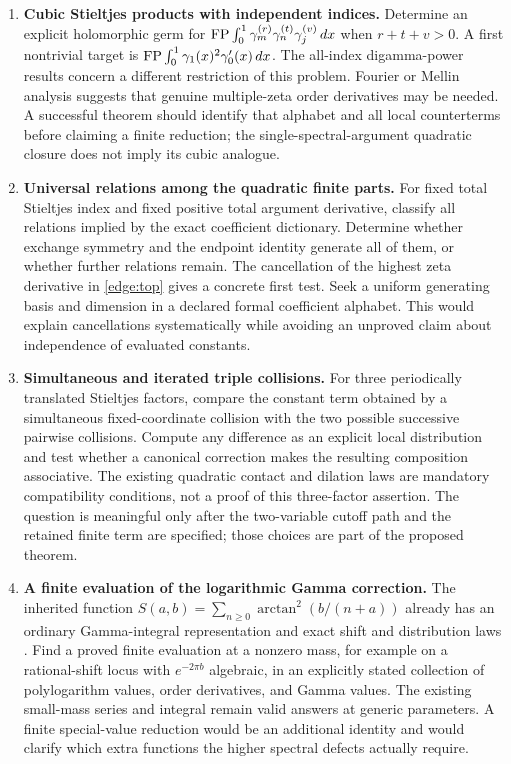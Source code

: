 \begin{enumerate}[leftmargin=*,label=\textbf{R\arabic*.}]
\item \textbf{Cubic Stieltjes products with independent indices.}
Determine an explicit holomorphic germ for
$\operatorname{FP}\int_0^1\gamma_m^{(r)}\gamma_n^{(t)}\gamma_j^{(v)}\,dx$
when $r+t+v>0$. A first nontrivial target is
$\operatorname{FP}\int_0^1\gamma_1(x)^2\gamma_0'(x)\,dx$.
The all-index digamma-power results concern a different restriction
of this problem. Fourier or Mellin analysis suggests that genuine
multiple-zeta order derivatives may be needed. A successful theorem
should identify that alphabet and all local counterterms before
claiming a finite reduction; the single-spectral-argument quadratic
closure does not imply its cubic analogue.

\item \textbf{Universal relations among the quadratic finite parts.}
For fixed total Stieltjes index and fixed positive total argument
derivative, classify all relations implied by the exact coefficient
dictionary. Determine whether exchange symmetry and the endpoint
identity generate all of them, or whether further relations remain.
The cancellation of the highest zeta derivative in
\eqref{edge:top} gives a concrete first test. Seek a uniform generating
basis and dimension in a declared formal coefficient alphabet. This
would explain cancellations systematically while avoiding an
unproved claim about independence of evaluated constants.

\item \textbf{Simultaneous and iterated triple collisions.}
For three periodically translated Stieltjes factors, compare the
constant term obtained by a simultaneous fixed-coordinate collision
with the two possible successive pairwise collisions. Compute any
difference as an explicit local distribution and test whether a
canonical correction makes the resulting composition associative.
The existing quadratic contact and dilation laws
\cite{manuscript} are mandatory compatibility conditions, not a proof
of this three-factor assertion. The question is meaningful only
after the two-variable cutoff path and the retained finite term are
specified; those choices are part of the proposed theorem.

\item \textbf{A finite evaluation of the logarithmic Gamma correction.}
The inherited function
$S(a,b)=\sum_{n\ge0}\arctan^2(b/(n+a))$ already has an ordinary
Gamma-integral representation and exact shift and distribution laws
\cite{tail-alternating}. Find a proved finite evaluation at a
nonzero mass, for example on a rational-shift locus with
$e^{-2\pi b}$ algebraic, in an explicitly stated collection of
polylogarithm values, order derivatives, and Gamma values. The
existing small-mass series and integral remain valid answers at
generic parameters. A finite special-value reduction would be an
additional identity and would clarify which extra functions the
higher spectral defects actually require.

\end{enumerate}

